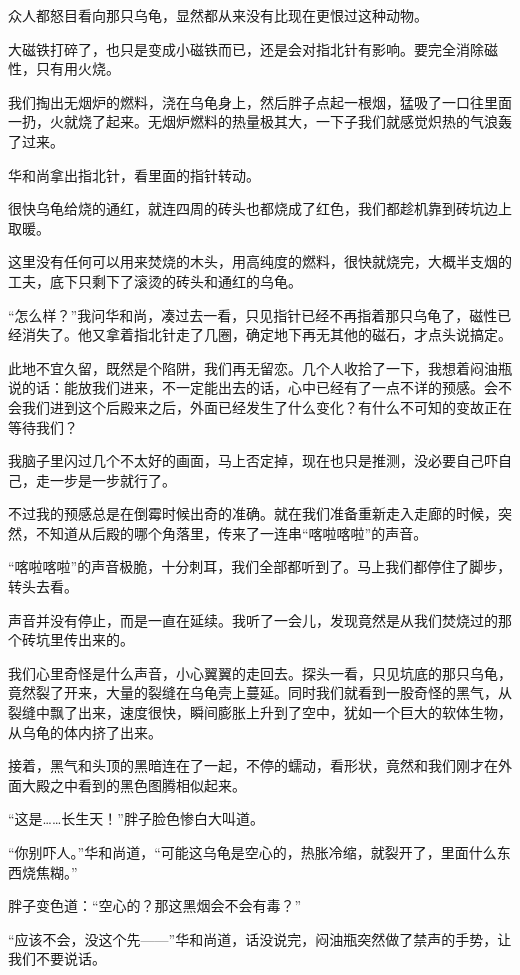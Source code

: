 众人都怒目看向那只乌龟，显然都从来没有比现在更恨过这种动物。

大磁铁打碎了，也只是变成小磁铁而已，还是会对指北针有影响。要完全消除磁性，只有用火烧。

我们掏出无烟炉的燃料，浇在乌龟身上，然后胖子点起一根烟，猛吸了一口往里面一扔，火就烧了起来。无烟炉燃料的热量极其大，一下子我们就感觉炽热的气浪轰了过来。

华和尚拿出指北针，看里面的指针转动。

很快乌龟给烧的通红，就连四周的砖头也都烧成了红色，我们都趁机靠到砖坑边上取暖。

这里没有任何可以用来焚烧的木头，用高纯度的燃料，很快就烧完，大概半支烟的工夫，底下只剩下了滚烫的砖头和通红的乌龟。

“怎么样？”我问华和尚，凑过去一看，只见指针已经不再指着那只乌龟了，磁性已经消失了。他又拿着指北针走了几圈，确定地下再无其他的磁石，才点头说搞定。

此地不宜久留，既然是个陷阱，我们再无留恋。几个人收拾了一下，我想着闷油瓶说的话：能放我们进来，不一定能出去的话，心中已经有了一点不详的预感。会不会我们进到这个后殿来之后，外面已经发生了什么变化？有什么不可知的变故正在等待我们？

我脑子里闪过几个不太好的画面，马上否定掉，现在也只是推测，没必要自己吓自己，走一步是一步就行了。

不过我的预感总是在倒霉时候出奇的准确。就在我们准备重新走入走廊的时候，突然，不知道从后殿的哪个角落里，传来了一连串“喀啦喀啦”的声音。

“喀啦喀啦”的声音极脆，十分刺耳，我们全部都听到了。马上我们都停住了脚步，转头去看。

声音并没有停止，而是一直在延续。我听了一会儿，发现竟然是从我们焚烧过的那个砖坑里传出来的。

我们心里奇怪是什么声音，小心翼翼的走回去。探头一看，只见坑底的那只乌龟，竟然裂了开来，大量的裂缝在乌龟壳上蔓延。同时我们就看到一股奇怪的黑气，从裂缝中飘了出来，速度很快，瞬间膨胀上升到了空中，犹如一个巨大的软体生物，从乌龟的体内挤了出来。

接着，黑气和头顶的黑暗连在了一起，不停的蠕动，看形状，竟然和我们刚才在外面大殿之中看到的黑色图腾相似起来。

“这是……长生天！”胖子脸色惨白大叫道。

“你别吓人。”华和尚道，“可能这乌龟是空心的，热胀冷缩，就裂开了，里面什么东西烧焦糊。”

胖子变色道：“空心的？那这黑烟会不会有毒？”

“应该不会，没这个先——”华和尚道，话没说完，闷油瓶突然做了禁声的手势，让我们不要说话。

